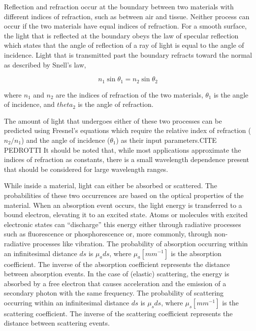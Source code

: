 Reflection and refraction occur at the boundary between two materials with different indices of refraction, such as between air and tissue. Neither process can occur if the two materials have equal indices of refraction. For a smooth surface, the light that is reflected at the boundary obeys the law of specular reflection which states that the angle of reflection of a ray of light is equal to the angle of incidence.\cite{Knight2013} Light that is transmitted past the boundary refracts toward the normal as described by Snell's law,

\begin{equation}
n_1 \sin \theta_1 = n_2 \sin \theta_2
\end{equation}

\noindent where $n_1$ and $n_2$ are the indices of refraction of the two materials, $\theta_1$ is the angle of incidence, and $theta_2$ is the angle of refraction.

The amount of light that undergoes either of these two processes can be predicted using Fresnel's equations which require the relative index of refraction ($n_2 / n_1$) and the angle of incidence ($\theta_1$) as their input parameters.CITE PEDROTTI It should be noted that, while most applications approximate the indices of refraction as constants, there is a small wavelength dependence present that should be considered for large wavelength ranges.\cite{Knight2013}

While inside a material, light can either be absorbed or scattered. The probabilities of these two occurrences are based on the optical properties of the material. When an absorption event occurs, the light energy is transferred to a bound electron, elevating it to an excited state.\cite{Jacques2004} Atoms or molecules with excited electronic states can ``discharge'' this energy either through radiative processes such as fluorescence or phosphorescence or, more commonly, through non-radiative processes like vibration. The probability of absorption occurring within an infinitesimal distance $ds$ is $\mu_ads$, where $\mu_a [mm^{-1}]$ is the absorption coefficient. The inverse of the absorption coefficient represents the distance between absorption events. In the case of (elastic) scattering, the energy is absorbed by a free electron that causes acceleration and the emission of a secondary photon with the same frequency.\cite{Jacques2004} The probability of scattering occurring within an infinitesimal distance $ds$ is $\mu_sds$, where $\mu_s [mm^{-1}]$ is the scattering coefficient. The inverse of the scattering coefficient represents the distance between scattering events.

